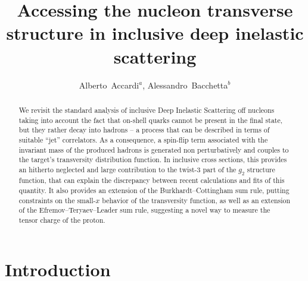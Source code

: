 \documentclass[preprintnumbers,floatfix,nofootinbib]{revtex4}
\begin{document}


\title{Accessing the nucleon transverse structure in inclusive deep inelastic scattering} 

\author{Alberto~Accardi$^{a}$, Alessandro~Bacchetta$^{b}$} 


\begin{abstract}
We revisit the standard analysis of inclusive Deep Inelastic Scattering
off nucleons taking into  account the fact that on-shell quarks cannot be present in the final state, but they rather decay into hadrons --  a process that can be described in terms of suitable ``jet'' correlators. As a consequence, a spin-flip term
associated with the invariant mass of the produced hadrons is generated
non perturbatively and couples to the target's transversity distribution
function. In inclusive cross sections, this provides an hitherto neglected and
large contribution to the twist-3 part of the $g_2$ structure function, that
can explain the discrepancy between recent calculations and fits of this
quantity.  It also provides an extension of the Burkhardt--Cottingham sum rule, putting constraints on the small-$x$ behavior of the transversity function, as well as an extension of the Efremov--Teryaev--Leader sum rule, suggesting a novel way to measure the tensor charge of the proton.
\end{abstract}



\maketitle


\section{Introduction}
\end{document}
